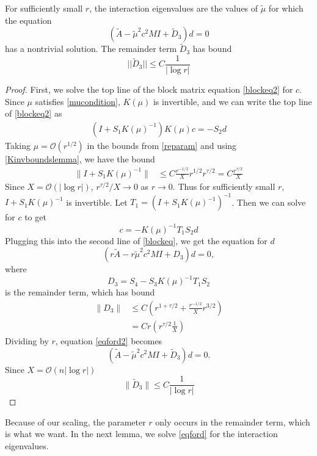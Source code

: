 \documentclass[thesis.tex]{subfiles}
\begin{document}
\begin{lemma}\label{deqlemma}
For sufficiently small $r$, the interaction eigenvalues are the values of $\tilde{\mu}$ for which the equation
\begin{equation}\label{eqford}
(\tilde{A} - \tilde{\mu}^2 c^2 MI + \tilde{D}_3)d = 0
\end{equation}
has a nontrivial solution. The remainder term $\tilde{D}_3$ has bound
\begin{equation}\label{tildeD3bound}
||\tilde{D}_3|| \leq C \frac{1}{|\log r|} 
\end{equation}
\begin{proof}
First, we solve the top line of the block matrix equation \eqref{blockeq2} for $c$. Since $\mu$ satisfies \cref{mucondition}, $K(\mu)$ is invertible, and we can write the top line of \eqref{blockeq2} as
\begin{align*}
(I + S_1 K(\mu)^{-1} ) K(\mu) c = -S_2 d
\end{align*}
Taking $\mu = \mathcal{O}(r^{1/2})$ in the bounds from \cref{reparam} and using \cref{Kinvboundslemma}, we have the bound
\begin{align*}
\|I + S_1 K(\mu)^{-1}\| &\leq C \frac{r^{-1/2}}{X} r^{1/2}r^{\tau/2} = C \frac{r^{\tau/2}}{X}
\end{align*}
Since $X = \mathcal{O}(|\log r|)$, $r^{\tau/2}/X \rightarrow 0$ as $r \rightarrow 0$. Thus for sufficiently small $r$, $I + S_1 K(\mu)^{-1}$ is invertible. Let $T_1 = (I + S_1 K(\mu)^{-1})^{-1}$. Then we can solve for $c$ to get
\[
c = -K(\mu)^{-1} T_1 S_2 d
\]
Plugging this into the second line of \eqref{blockeq}, we get the equation for $d$
\begin{equation}\label{eqford2}
(r\tilde{A} - r \tilde{\mu}^2 c^2  M I + D_3)d = 0,
\end{equation}
where
\[
D_3 = S_4 - S_3 K(\mu)^{-1} T_1 S_2 
\]
is the remainder term, which has bound
\begin{align*}
\|D_3\| &\leq C \left( r^{1 + \tau/2} + \frac{r^{-1/2}}{X} r^{3/2} \right) \\
&= C r\left( r^{\tau/2} \frac{1}{X} \right)
\end{align*}
Dividing by $r$, equation \cref{eqford2} becomes
\[
(\tilde{A} - \tilde{\mu}^2 c^2 MI + \tilde{D}_3)d = 0.
\]
Since $X = \mathcal{O}(n |\log r|)$
\[
\|\tilde{D}_3\| \leq C \frac{1}{|\log r|} 
\]
\end{proof}
\end{lemma}

Because of our scaling, the parameter $r$ only occurs in the remainder term, which is what we want. In the next lemma, we solve \eqref{eqford} for the interaction eigenvalues.
\end{document}
